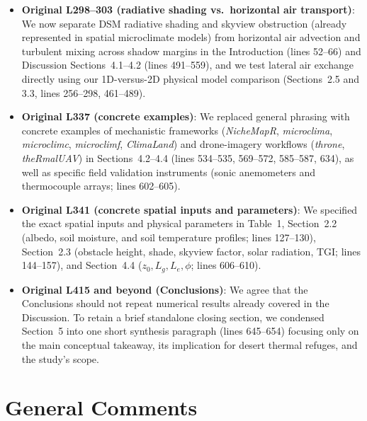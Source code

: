 \documentclass[12pt,english]{reviewresponse}
\begin{document}
\begin{revresponse}
\begin{itemize}[leftmargin=*, itemsep=0.2em]
    \item \textbf{Original L298--303 (radiative shading vs.\ horizontal air transport)}: We now separate DSM radiative shading and skyview obstruction (already represented in spatial microclimate models) from horizontal air advection and turbulent mixing across shadow margins in the Introduction (lines 52--66) and Discussion Sections~4.1--4.2 (lines 491--559), and we test lateral air exchange directly using our 1D-versus-2D physical model comparison (Sections~2.5 and 3.3, lines 256--298, 461--489).
    \item \textbf{Original L337 (concrete examples)}: We replaced general phrasing with concrete examples of mechanistic frameworks (\textit{NicheMapR}, \textit{microclima}, \textit{microclimc}, \textit{microclimf}, \textit{ClimaLand}) and drone-imagery workflows (\textit{throne}, \textit{theRmalUAV}) in Sections~4.2--4.4 (lines 534--535, 569--572, 585--587, 634), as well as specific field validation instruments (sonic anemometers and thermocouple arrays; lines 602--605).
    \item \textbf{Original L341 (concrete spatial inputs and parameters)}: We specified the exact spatial inputs and physical parameters in Table~1, Section~2.2 (albedo, soil moisture, and soil temperature profiles; lines 127--130), Section~2.3 (obstacle height, shade, skyview factor, solar radiation, TGI; lines 144--157), and Section~4.4 ($z_0, L_g, L_e, \phi$; lines 606--610).
    \item \textbf{Original L415 and beyond (Conclusions)}: We agree that the Conclusions should not repeat numerical results already covered in the Discussion. To retain a brief standalone closing section, we condensed Section~5 into one short synthesis paragraph (lines 645--654) focusing only on the main conceptual takeaway, its implication for desert thermal refuges, and the study's scope.
\end{itemize}
\end{revresponse}

\clearpage

\reviewer

\section*{General Comments}
\end{document}
